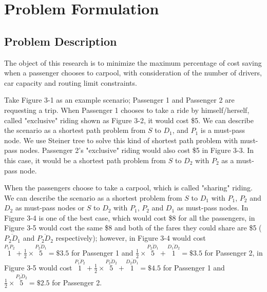 
\chapter{Problem Formulation}

\section{Problem Description}

The object of this research is to minimize the maximum percentage of cost saving when a passenger chooses to carpool, with consideration of the number of drivers, car capacity and routing limit constraints.

Take Figure 3-1 as an example scenario; Passenger 1 and Passenger 2 are requesting a trip. When Passenger 1 chooses to take a ride by himself/herself, called "exclusive" riding shown as Figure 3-2, it would cost \$5. We can describe the scenario as a shortest path problem from $S$ to $D_1$, and $P_1$ is a must-pass node. We use Steiner tree to solve this kind of shortest path problem with must-pass nodes. Passenger 2's "exclusive" riding would also cost \$5 in Figure 3-3. In this case, it would be a shortest path problem from $S$ to $D_2$ with $P_2$ as a must-pass node.

When the passengers choose to take a carpool, which is called "sharing" riding. We can describe the scenario as a shortest problem from $S$ to $D_1$ with $P_1$, $P_2$ and $D_2$ as must-pass nodes or $S$ to $D_2$ with $P_1$, $P_2$ and $D_1$ as must-pass nodes. In Figure 3-4 is one of the best case, which would cost \$8 for all the passengers, in Figure 3-5 would cost the same \$8 and both of the fares they could share are \$5 ( $\overline{P_2D_1}$ and $\overline{P_2D_2}$ respectively); however, in Figure 3-4 would cost $\overset{\overline{P_1P_2}}{1} + \frac{1}{2} \times \overset{\overline{P_2D_1}}{5} = \$3.5$ for Passenger 1 and $\frac{1}{2} \times \overset{\overline{P_2D_1}}{5} + \overset{\overline{D_1D_2}}{1} = \$3.5$ for Passenger 2, in Figure 3-5 would cost $\overset{\overline{P_1P_2}}{1} + \frac{1}{2} \times \overset{\overline{P_2D_2}}{5} + \overset{\overline{D_2D_1}}{1} = \$4.5$ for Passenger 1 and $\frac{1}{2} \times \overset{\overline{P_2D_2}}{5} = \$2.5$ for Passenger 2.

